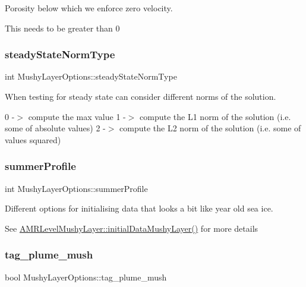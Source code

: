 Porosity below which we enforce zero velocity. 

This needs to be greater than 0 \mbox{\label{struct_mushy_layer_options_a8215f286dafdbe573df73258b544f307}} 
\subsubsection{\texorpdfstring{steady\+State\+Norm\+Type}{steadyStateNormType}}
{\footnotesize\ttfamily int Mushy\+Layer\+Options\+::steady\+State\+Norm\+Type}



When testing for steady state can consider different norms of the solution. 

0 -\/$>$ compute the max value 1 -\/$>$ compute the L1 norm of the solution (i.\+e. some of absolute values) 2 -\/$>$ compute the L2 norm of the solution (i.\+e. some of values squared) \mbox{\label{struct_mushy_layer_options_a101f8a57293409a158e31d44b2aea6ed}} 
\subsubsection{\texorpdfstring{summer\+Profile}{summerProfile}}
{\footnotesize\ttfamily int Mushy\+Layer\+Options\+::summer\+Profile}



Different options for initialising data that looks a bit like year old sea ice. 

See \hyperlink{class_a_m_r_level_mushy_layer_a601849adc5f5b5fc9e9999b568020922}{A\+M\+R\+Level\+Mushy\+Layer\+::initial\+Data\+Mushy\+Layer()} for more details \mbox{\label{struct_mushy_layer_options_ac65cf5a7ea59d60c33af0141d9d940c3}} 
\subsubsection{\texorpdfstring{tag\+\_\+plume\+\_\+mush}{tag\_plume\_mush}}
{\footnotesize\ttfamily bool Mushy\+Layer\+Options\+::tag\+\_\+plume\+\_\+mush}



